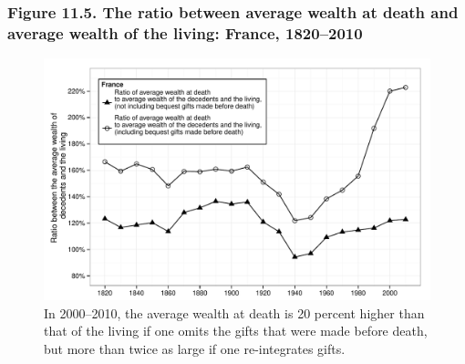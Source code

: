 \documentclass[t]{beamer}\usepackage[]{graphicx}\usepackage[]{color}
\newenvironment{knitrout}{}{} %
\begin{document}
\begin{frame}[label=Figure_11_5]
\frametitle{Figure 11.5. The ratio between average wealth at death and average wealth of the living: France, 1820--2010}
\begin{figure}[t]
\begin{minipage}[b]{\textwidth}
\centering
\begin{knitrout}\footnotesize
{}\color{fgcolor}

{\centering \includegraphics[width=1\linewidth]{figures/bw/Figure_11_5} 

}



\end{knitrout}
\caption{In 2000--2010, the average wealth at death is 20 percent higher than that of the living if one omits the gifts that were made before death, but more than twice as large if one re-integrates gifts.}
\end{minipage}
\end{figure}
\end{frame}
\end{document}
